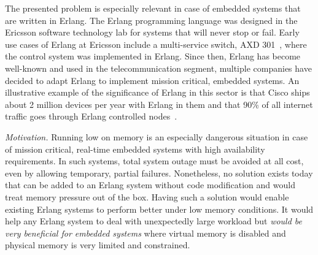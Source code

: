 \documentclass{llncs}
\begin{document}
The presented problem is especially relevant in case of embedded systems that are written in Erlang. The Erlang programming language was designed in the Ericsson software technology lab for systems that will never stop or fail. Early use cases of Erlang at Ericsson include a multi-service switch, AXD 301~\cite{axd}, where the control system was implemented in Erlang. Since then, Erlang has become well-known and used in the telecommunication segment, multiple companies have decided to adapt Erlang to implement mission critical, embedded systems. An illustrative example of the significance of Erlang in this sector is that Cisco ships about 2 million devices per year with Erlang in them and that 90\% of all internet traffic goes through Erlang controlled nodes~\cite{johan}.

 
\emph{Motivation.} Running low on memory is an especially dangerous  situation in case of mission critical, real-time embedded systems with high availability requirements. In such systems, total system outage must be avoided at all cost, even by allowing temporary, partial failures. Nonetheless, no solution exists today that can be added to an Erlang system without code modification and would treat memory pressure out of the box. Having such a solution would enable existing Erlang systems to perform better under low memory conditions. It would help any Erlang system to deal with unexpectedly large workload  but \emph{would be very beneficial for embedded systems} where virtual memory is disabled and physical memory is very limited and constrained. %
\end{document}

